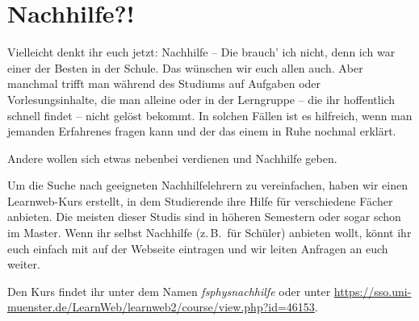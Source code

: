 \section{Nachhilfe?!}
\begin{multicols}{2}
Vielleicht denkt ihr euch jetzt: Nachhilfe -- Die brauch' ich nicht, denn ich war einer der Besten in der Schule. Das wünschen wir euch allen auch. Aber manchmal trifft man während des Studiums auf Aufgaben oder Vorlesungsinhalte, die man alleine oder in der Lerngruppe -- die ihr hoffentlich schnell findet -- nicht gelöst bekommt. In solchen Fällen ist es hilfreich, wenn man jemanden Erfahrenes fragen kann und der das einem in Ruhe nochmal erklärt.

Andere wollen sich etwas nebenbei verdienen und Nachhilfe geben.

Um die Suche nach geeigneten Nachhilfelehrern zu vereinfachen, haben wir einen Learnweb-Kurs erstellt, in dem Studierende ihre Hilfe für verschiedene Fächer anbieten. Die meisten dieser Studis sind in höheren Semestern oder sogar schon im Master. Wenn ihr selbst Nachhilfe (z.\,B.\ für Schüler) anbieten wollt, könnt ihr euch einfach mit auf der Webseite eintragen und wir leiten Anfragen an euch weiter.

Den Kurs findet ihr unter dem Namen \textit{fsphysnachhilfe} oder unter \url{https://sso.uni-muenster.de/LearnWeb/learnweb2/course/view.php?id=46153}.

\end{multicols}
